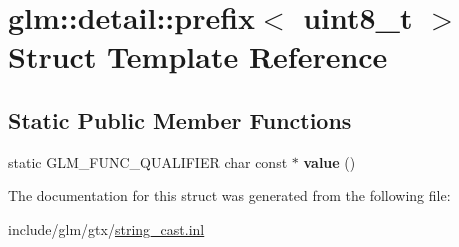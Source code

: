\hypertarget{structglm_1_1detail_1_1prefix_3_01uint8__t_01_4}{}\section{glm\+:\+:detail\+:\+:prefix$<$ uint8\+\_\+t $>$ Struct Template Reference}
\label{structglm_1_1detail_1_1prefix_3_01uint8__t_01_4}
\subsection*{Static Public Member Functions}
\begin{DoxyCompactItemize}
\item 
\mbox{\label{structglm_1_1detail_1_1prefix_3_01uint8__t_01_4_a890818b4dedbe09730336c1ae3913339}} 
static G\+L\+M\+\_\+\+F\+U\+N\+C\+\_\+\+Q\+U\+A\+L\+I\+F\+I\+ER char const  $\ast$ {\bfseries value} ()
\end{DoxyCompactItemize}


The documentation for this struct was generated from the following file\+:\begin{DoxyCompactItemize}
\item 
include/glm/gtx/\hyperlink{string__cast_8inl}{string\+\_\+cast.\+inl}\end{DoxyCompactItemize}
